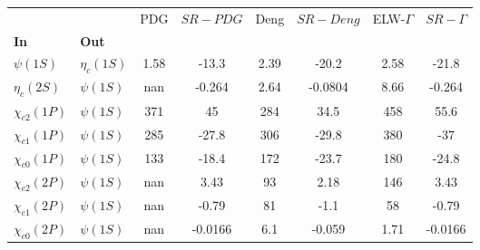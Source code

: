 \begin{tabular}{l|l|c|c|c|c|c|c}
\toprule
                &            &  PDG & $SR-PDG$ &  Deng & $SR-Deng$ &  ELW-$\Gamma$ & $SR-\Gamma$ \\
\textbf{In} & \textbf{Out} &      &          &       &           &               &             \\
\midrule
\textbf{$\psi(1S)$} & \textbf{$\eta_{c}(1S)$} & 1.58 &    -13.3 &  2.39 &     -20.2 &          2.58 &       -21.8 \\
\textbf{$\eta_{c}(2S)$} & \textbf{$\psi(1S)$} &  nan &   -0.264 &  2.64 &   -0.0804 &          8.66 &      -0.264 \\
\textbf{$\chi_{c2}(1P)$} & \textbf{$\psi(1S)$} &  371 &       45 &   284 &      34.5 &           458 &        55.6 \\
\textbf{$\chi_{c1}(1P)$} & \textbf{$\psi(1S)$} &  285 &    -27.8 &   306 &     -29.8 &           380 &         -37 \\
\textbf{$\chi_{c0}(1P)$} & \textbf{$\psi(1S)$} &  133 &    -18.4 &   172 &     -23.7 &           180 &       -24.8 \\
\textbf{$\chi_{c2}(2P)$} & \textbf{$\psi(1S)$} &  nan &     3.43 &    93 &      2.18 &           146 &        3.43 \\
\textbf{$\chi_{c1}(2P)$} & \textbf{$\psi(1S)$} &  nan &    -0.79 &    81 &      -1.1 &            58 &       -0.79 \\
\textbf{$\chi_{c0}(2P)$} & \textbf{$\psi(1S)$} &  nan &  -0.0166 &   6.1 &    -0.059 &          1.71 &     -0.0166 \\
\bottomrule
\end{tabular}
